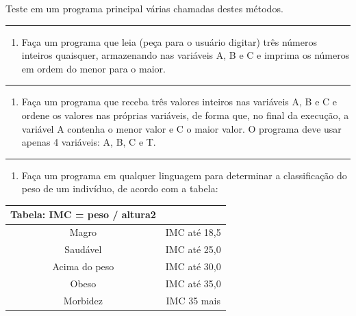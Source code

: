 \documentclass[12pt,a4paper]{article}
\providecommand{\tightlist}{%
      \setlength{\itemsep}{0pt}\setlength{\parskip}{0pt}}
\begin{document}
Teste em um programa principal várias chamadas destes métodos.

    \begin{center}\rule{0.5\linewidth}{0.5pt}\end{center}

\begin{enumerate}
\def\labelenumi{\arabic{enumi}.}
\setcounter{enumi}{1}
\tightlist
\item
  Faça um programa que leia (peça para o usuário digitar) três números
  inteiros quaisquer, armazenando nas variáveis A, B e C e imprima os
  números em ordem do menor para o maior.
\end{enumerate}

    \begin{center}\rule{0.5\linewidth}{0.5pt}\end{center}

\begin{enumerate}
\def\labelenumi{\arabic{enumi}.}
\setcounter{enumi}{2}
\tightlist
\item
  Faça um programa que receba três valores inteiros nas variáveis A, B e
  C e ordene os valores nas próprias variáveis, de forma que, no final
  da execução, a variável A contenha o menor valor e C o maior valor. O
  programa deve usar apenas 4 variáveis: A, B, C e T.
\end{enumerate}

    \begin{center}\rule{0.5\linewidth}{0.5pt}\end{center}

\begin{enumerate}
\def\labelenumi{\arabic{enumi}.}
\setcounter{enumi}{3}
\tightlist
\item
  Faça um programa em qualquer linguagem para determinar a classificação
  do peso de um indivíduo, de acordo com a tabela:
\end{enumerate}

    \begin{longtable}[]{@{}cc@{}}
\toprule()
Tabela: IMC = peso / altura2 & \\
\midrule()
\endhead
Magro & IMC até 18,5 \\
Saudável & IMC até 25,0 \\
Acima do peso & IMC até 30,0 \\
Obeso & IMC até 35,0 \\
Morbidez & IMC 35 mais \\
\bottomrule()
\end{longtable}
\end{document}
